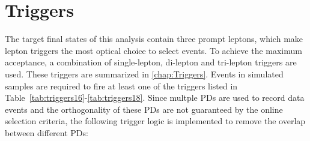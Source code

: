 \begin{table}
\sffamily
\caption{Summary of the configurations of the \ac{MC} samples. DYM50 (DYM10to50) denote DY sample with a dilepton invariant mass greater than 50 GeV (between 10 and 50 GeV). V includes W and Z bosons. The cross sections for samples without a citation are taken directly from their event generators.}
\centering
  \label{tab:MCsample}
 \end{table} 
\section{Triggers}
\label{sec:Triggers}

The target final states of this analysis contain three prompt leptons, which make lepton triggers the most optical choice to select events. To achieve the maximum acceptance, a combination of single-lepton, di-lepton and tri-lepton triggers are used. These triggers are summarized in \autoref{chap:Triggers}. Events in simulated samples are required to fire at least one of the triggers listed in Table~\ref{tab:triggers16}-\ref{tab:triggers18}. Since multple \acp{PD} are used to record data events and the orthogonality of these \acp{PD} are not guaranteed by the online selection criteria, the following trigger logic is implemented to remove the overlap between different \acp{PD}:

